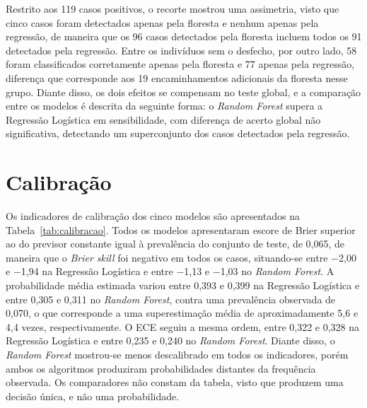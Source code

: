 Restrito aos 119 casos positivos, o recorte mostrou uma assimetria, visto que cinco casos foram detectados apenas pela floresta e nenhum apenas pela regressão, de maneira que os 96 casos detectados pela floresta incluem todos os 91 detectados pela regressão. Entre os indivíduos sem o desfecho, por outro lado, 58 foram classificados corretamente apenas pela floresta e 77 apenas pela regressão, diferença que corresponde aos 19 encaminhamentos adicionais da floresta nesse grupo. Diante disso, os dois efeitos se compensam no teste global, e a comparação entre os modelos é descrita da seguinte forma: o \textit{Random Forest} supera a Regressão Logística em sensibilidade, com diferença de acerto global não significativa, detectando um superconjunto dos casos detectados pela regressão.

\section{Calibração}\label{sec:res-calibracao}
Os indicadores de calibração dos cinco modelos são apresentados na Tabela~\ref{tab:calibracao}. Todos os modelos apresentaram escore de Brier superior ao do previsor constante igual à prevalência do conjunto de teste, de 0,065, de maneira que o \textit{Brier skill} foi negativo em todos os casos, situando-se entre $-$2,00 e $-$1,94 na Regressão Logística e entre $-$1,13 e $-$1,03 no \textit{Random Forest}. A probabilidade média estimada variou entre 0,393 e 0,399 na Regressão Logística e entre 0,305 e 0,311 no \textit{Random Forest}, contra uma prevalência observada de 0,070, o que corresponde a uma superestimação média de aproximadamente 5,6 e 4,4 vezes, respectivamente. O ECE seguiu a mesma ordem, entre 0,322 e 0,328 na Regressão Logística e entre 0,235 e 0,240 no \textit{Random Forest}. Diante disso, o \textit{Random Forest} mostrou-se menos descalibrado em todos os indicadores, porém ambos os algoritmos produziram probabilidades distantes da frequência observada. Os comparadores não constam da tabela, visto que produzem uma decisão única, e não uma probabilidade.

